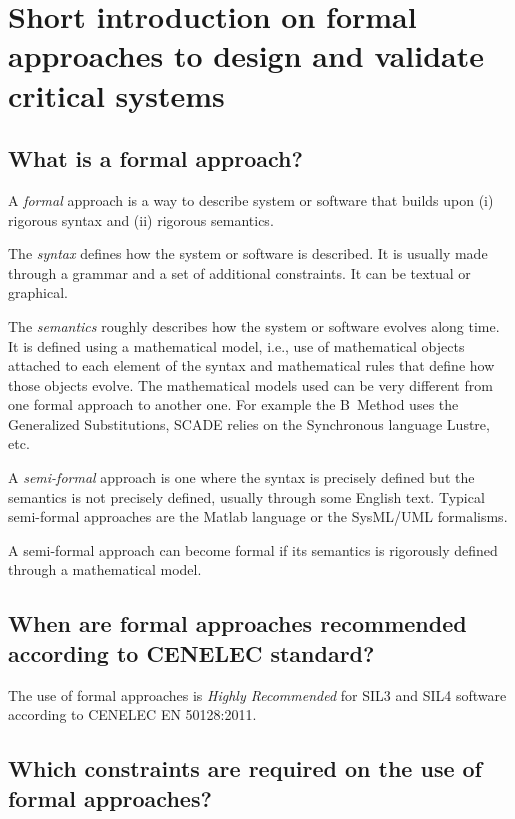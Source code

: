 

\section{Short introduction on formal approaches to  design and validate critical systems}

\subsection{What is a formal approach?}

A \emph{formal} approach is a way to describe system or software
that builds upon (i) rigorous syntax and (ii) rigorous semantics.

The \emph{syntax} defines how the system or software is described. It
is usually made through a grammar and a set of additional
constraints. It can be textual or graphical.

The \emph{semantics} roughly describes how the system or software
evolves along time. It is defined using a mathematical model, i.e., use
of mathematical objects attached to each element of the syntax and
mathematical rules that define how those objects evolve. The
mathematical models used can be very different from one formal approach
to another one. For example the B~Method uses the Generalized
Substitutions, SCADE relies on the Synchronous language Lustre, etc.

A \emph{semi-formal} approach is one where the syntax is precisely
defined but the semantics is not precisely defined, usually through some
English text. Typical semi-formal approaches are the Matlab language or
the SysML/UML formalisms.

A semi-formal approach can become formal if its semantics is
rigorously defined through a mathematical model.

\subsection{When are formal approaches recommended according to CENELEC standard?}

The use of formal approaches is \emph{Highly Recommended} for SIL3 and
SIL4 software according to CENELEC EN 50128:2011.

\subsection{Which constraints are required on the use of formal approaches?}

